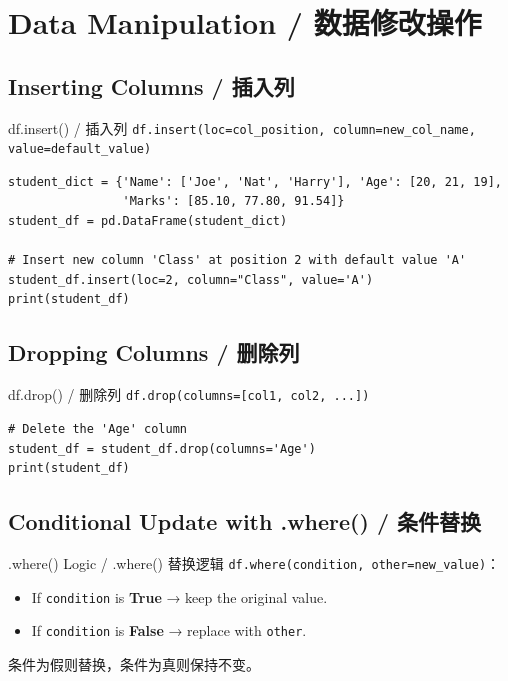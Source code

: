 \documentclass[11pt,a4paper]{article}
\begin{document}
\section{Data Manipulation / 数据修改操作}

\subsection{Inserting Columns / 插入列}

\begin{examplebox}{df.insert() / 插入列}
    \texttt{df.insert(loc=col\_position, column=new\_col\_name, value=default\_value)}
\begin{lstlisting}
student_dict = {'Name': ['Joe', 'Nat', 'Harry'], 'Age': [20, 21, 19],
                'Marks': [85.10, 77.80, 91.54]}
student_df = pd.DataFrame(student_dict)

# Insert new column 'Class' at position 2 with default value 'A'
student_df.insert(loc=2, column="Class", value='A')
print(student_df)
\end{lstlisting}
\end{examplebox}

\subsection{Dropping Columns / 删除列}

\begin{examplebox}{df.drop() / 删除列}
    \texttt{df.drop(columns=[col1, col2, ...])}
\begin{lstlisting}
# Delete the 'Age' column
student_df = student_df.drop(columns='Age')
print(student_df)
\end{lstlisting}
\end{examplebox}

\subsection{Conditional Update with .where() / 条件替换}

\begin{concept}{.where() Logic / .where() 替换逻辑}
    \texttt{df.where(condition, other=new\_value)}：
    \begin{itemize}[itemsep=0.3em]
        \item If \texttt{condition} is \textbf{True} → keep the original value.
        \item If \texttt{condition} is \textbf{False} → replace with \texttt{other}.
    \end{itemize}
    条件为假则替换，条件为真则保持不变。
\end{concept}
\end{document}
